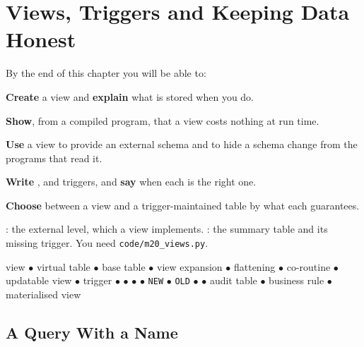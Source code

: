 \chapter{Views, Triggers and Keeping Data Honest}\label{ch:views}

\begin{outcomes}
By the end of this chapter you will be able to:
\begin{tight}
  \item \textbf{Create} a view and \textbf{explain} what is stored when you
        do.
  \item \textbf{Show}, from a compiled program, that a view costs nothing at
        run time.
  \item \textbf{Use} a view to provide an external schema and to hide a
        schema change from the programs that read it.
  \item \textbf{Write} ,  and 
        triggers, and \textbf{say} when each is the right one.
  \item \textbf{Choose} between a view and a trigger-maintained table by what
        each guarantees.
\end{tight}
\end{outcomes}

\begin{prereq}
: the external level, which a view implements.
: the summary table and its missing 
trigger. You need \texttt{code/m20\_views.py}.
\end{prereq}

\begin{keyterms}
view $\bullet$ virtual table $\bullet$ base table $\bullet$ view expansion
$\bullet$ flattening $\bullet$ co-routine $\bullet$ updatable view $\bullet$
trigger $\bullet$  $\bullet$  $\bullet$
 $\bullet$ \texttt{NEW} $\bullet$ \texttt{OLD} $\bullet$
 $\bullet$ audit table $\bullet$ business rule $\bullet$
materialised view
\end{keyterms}

\section{A Query With a Name}


